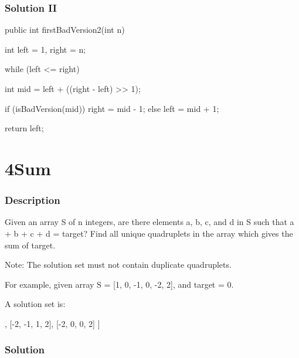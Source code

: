 \subsubsection{Solution II}
\begin{Code}
public int firstBadVersion2(int n) {
    int left = 1, right = n;

    while (left <= right) {
        int mid = left + ((right - left) >> 1);

        if (isBadVersion(mid)) {
            right = mid - 1;
        } else {
            left = mid + 1;
        }
    }

    return left;
}
\end{Code}

\newpage

\section{4Sum} %

\subsubsection{Description}
Given an array S of n integers, are there elements a, b, c, and d in S such that a + b + c + d = target? Find all unique quadruplets in the array which gives the sum of target.

Note: The solution set must not contain duplicate quadruplets.

For example, given array S = [1, 0, -1, 0, -2, 2], and target = 0.

A solution set is:
\begin{Code}
[
  [-1,  0, 0, 1],
  [-2, -1, 1, 2],
  [-2,  0, 0, 2]
]
\end{Code}
\subsubsection{Solution}

